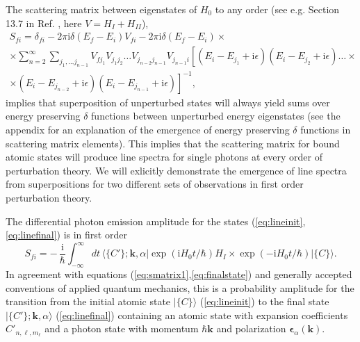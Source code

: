 \documentclass[final,3p,12pt]{elsarticle3}
\begin{document}
The scattering matrix between eigenstates of $H_0$ to any order
(see e.g. Section 13.7 in Ref. \cite{rdqm}, here $V=H_I+H_{II}$),
\begin{multline}
S_{\!fi}=\delta_{fi}-2\pi\mathrm{i}\delta(E_f-E_i)V_{fi}
-2\pi\mathrm{i}\delta(E_f-E_i)\times
\\ 
\times\sum_{n=2}^\infty\sum_{j_1,\ldots j_{n-1}}
V_{fj_1}V_{j_1 j_2}\ldots V_{j_{n-2}j_{n-1}}V_{j_{n-1}i}
\left[(E_i-E_{j_1}+\mathrm{i}\epsilon)(E_i-E_{j_2}+\mathrm{i}\epsilon)\ldots
\right. \times
\\ \label{eq:Snthorder}
\times\left.
(E_i-E_{j_{n-2}}+\mathrm{i}\epsilon)(E_i-E_{j_{n-1}}+\mathrm{i}\epsilon)\right]^{-1},
\end{multline}
implies that superposition of unperturbed states will always yield sums over energy 
preserving $\delta$ functions between unperturbed energy eigenstates (see the 
appendix for an explanation of the emergence of energy preserving $\delta$ functions
in scattering matrix elements). This implies 
that the scattering matrix for bound atomic states will produce line spectra for 
single photons at every order of perturbation theory. We will exlicitly demonstrate 
the emergence of line spectra from superpositions for two different sets of 
observations in first order perturbation theory.

The differential photon emission amplitude for the 
states (\ref{eq:lineinit},\ref{eq:linefinal}) is in first order 
\begin{equation}
S_{\!fi}=-\,\frac{\mathrm{i}}{\hbar}\int_{-\infty}^\infty\!dt\,\bm{\langle}
\{C'\};\bm{k},\alpha\bm{|}\exp(\mathrm{i}H_0t/\hbar)
H_I
\label{eq:line1}
\times\exp(-\mathrm{i}H_0t/\hbar)\bm{|}\{C\}\bm{\rangle}.
\end{equation}
In agreement with equations (\ref{eq:smatrix1},\ref{eq:finalstate})
and generally accepted conventions of applied quantum mechanics,
this is a probability amplitude for the transition from the initial
atomic state $\bm{|}\{C\}\bm{\rangle}$ (\ref{eq:lineinit}) to the final 
state $\bm{|}\{C'\};\bm{k},\alpha\bm{\rangle}$ (\ref{eq:linefinal})
containing an atomic state with expansion coefficients $C'_{n,\ell,m_\ell}$ 
and a photon state with momentum $\hbar\bm{k}$ and 
polarization $\bm{\epsilon}_\alpha(\bm{k})$. 
\end{document}
